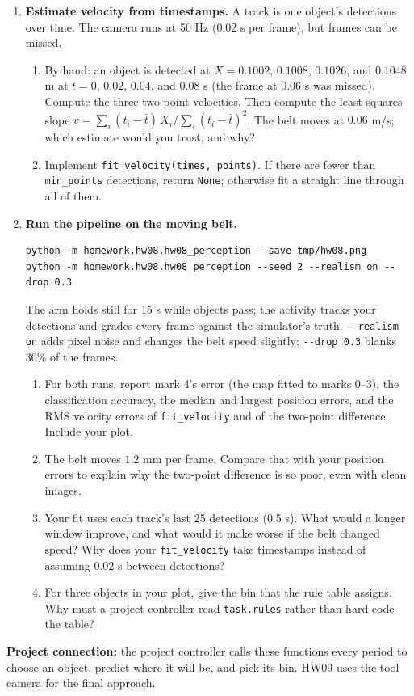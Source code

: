 \begin{enumerate}
\item \textbf{Estimate velocity from timestamps.}
A track is one object's detections over time. The camera runs at 50 Hz
(0.02 s per frame), but frames can be missed.
\begin{enumerate}
\item By hand: an object is detected at $X = 0.1002$, $0.1008$, $0.1026$,
and $0.1048$ m at $t = 0$, $0.02$, $0.04$, and $0.08$ s (the frame at
$0.06$ s was missed). Compute the three two-point velocities. Then compute
the least-squares slope
$v=\sum_i (t_i-\bar t)\,X_i \big/ \sum_i (t_i-\bar t)^2$. The belt moves at
$0.06$ m/s; which estimate would you trust, and why?
\item Implement \texttt{fit\_velocity(times, points)}. If there are fewer
than \texttt{min\_points} detections, return \texttt{None}; otherwise fit a
straight line through all of them.
\end{enumerate}

\item \textbf{Run the pipeline on the moving belt.}
\begin{lstlisting}
python -m homework.hw08.hw08_perception --save tmp/hw08.png
python -m homework.hw08.hw08_perception --seed 2 --realism on --drop 0.3
\end{lstlisting}
The arm holds still for 15 s while objects pass; the activity tracks your
detections and grades every frame against the simulator's truth. \texttt{-{}-realism on} adds
pixel noise and changes the belt speed slightly; \texttt{-{}-drop 0.3} blanks
30\% of the frames.
\begin{enumerate}
\item For both runs, report mark 4's error (the map fitted to marks 0--3),
the classification accuracy, the median and largest position errors, and the RMS velocity errors of
\texttt{fit\_velocity} and of the two-point difference. Include your plot.
\item The belt moves $1.2$ mm per frame. Compare that with your position
errors to explain why the two-point difference is so poor, even with clean
images.
\item Your fit uses each track's last 25 detections (0.5 s). What would a
longer window improve, and what would it make worse if the belt changed
speed? Why does your \texttt{fit\_velocity} take timestamps instead of
assuming 0.02 s between detections?
\item For three objects in your plot, give the bin that the rule table
assigns. Why must a project controller read \texttt{task.rules} rather than
hard-code the table?
\end{enumerate}
\end{enumerate}

\textbf{Project connection:} the project controller calls these functions
every period to choose an object, predict where it will be, and pick its
bin. HW09 uses the tool camera for the final approach.

\submission

